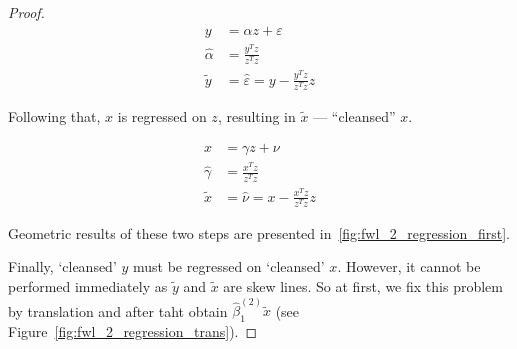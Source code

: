 \documentclass[nobib]{tufte-handout}
\theoremstyle{definition}
\begin{document}
\begin{proof}
\begin{equation}\label{eq:fwl_2_y_clean}
\begin{aligned}
y &= \alpha z + \varepsilon \\
\hat\alpha &= \frac{y^T z}{z^T z} \\
\tilde{y} &= \hat\varepsilon = y - \frac{y^T z}{z^T z}z
\end{aligned}
\end{equation}

Following that, $x$ is regressed on $z$, resulting in $\tilde{x}$ — ``cleansed'' $x$.

\begin{equation}\label{eq:fwl_2_x_clean}
\begin{aligned}
x &= \gamma z + \nu \\
\hat\gamma &= \frac{x^T z}{z^T z} \\
\tilde{x} &= \hat\nu = x - \frac{x^T z}{z^T z}z
\end{aligned}
\end{equation}

Geometric results of these two steps are presented in~\ref{fig:fwl_2_regression_first}.

Finally, `cleansed' $y$ must be regressed on `cleansed' $x$. However, it cannot be performed immediately as $\tilde{y}$ and $\tilde{x}$ are skew lines.
So at first, we fix this problem by translation and after taht obtain $\hat\beta_1^{(2)}\tilde x$ (see Figure~\ref{fig:fwl_2_regression_trans}).


\end{proof}
\end{document}
